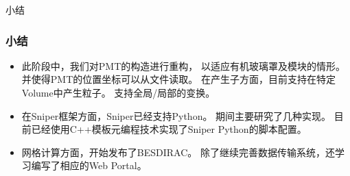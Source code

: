\begin{frame}
    \begin{center}
        \LARGE 小结
    \end{center}
\end{frame}

\begin{frame}
    \frametitle{小结}
    \begin{itemize}
        \item 此阶段中，我们对PMT的构造进行重构，
              以适应有机玻璃罩及模块的情形。
              并使得PMT的位置坐标可以从文件读取。
              在产生子方面，目前支持在特定Volume中产生粒子。
              支持全局/局部的变换。
        \item 在Sniper框架方面，Sniper已经支持Python。
              期间主要研究了几种实现。
              目前已经使用C++模板元编程技术实现了Sniper Python的脚本配置。
        \item 网格计算方面，开始发布了BESDIRAC。
              除了继续完善数据传输系统，还学习编写了相应的Web Portal。
    \end{itemize}
\end{frame}

